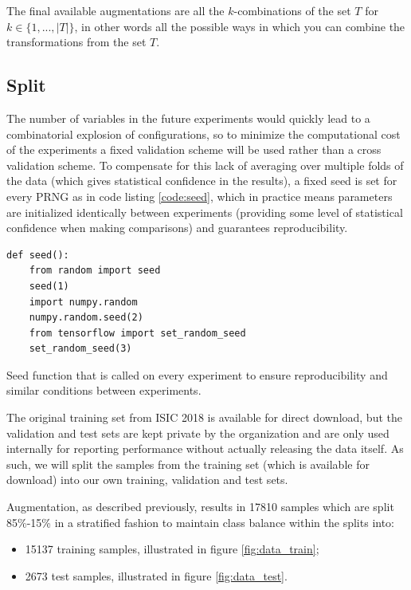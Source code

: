 The final available augmentations are all the $k$-combinations of the set $T$ for $k \in \{1, ..., |T|\}$, in other words all the possible ways in which you can combine the transformations from the set $T$.

\subsection{Split}

The number of variables in the future experiments would quickly lead to a combinatorial explosion of configurations, so to minimize the computational cost of the experiments a fixed validation scheme will be used rather than a cross validation scheme. To compensate for this lack of averaging over multiple folds of the data (which gives statistical confidence in the results), a fixed seed is set for every \ac{PRNG} as in code listing \ref{code:seed}, which in practice means parameters are initialized identically between experiments (providing some level of statistical confidence when making comparisons) and guarantees reproducibility.

\begin{listing}[ht]
\begin{verbatim}
def seed():
    from random import seed
    seed(1)
    import numpy.random
    numpy.random.seed(2)
    from tensorflow import set_random_seed
    set_random_seed(3)
\end{verbatim}
\caption{Seed function that is called on every experiment to ensure reproducibility and similar conditions between experiments.}
\label{code:seed}
\end{listing}

The original training set from \ac{ISIC} 2018 is available for direct download, but the validation and test sets are kept private by the organization and are only used internally for reporting performance without actually releasing the data itself. As such, we will split the samples from the training set (which is available for download) into our own training, validation and test sets.

Augmentation, as described previously, results in 17810 samples which are split 85\%-15\% in a stratified fashion to maintain class balance within the splits into:

\begin{itemize}
    \item 15137 training samples, illustrated in figure \ref{fig:data_train};
    \item 2673 test samples, illustrated in figure \ref{fig:data_test}.
\end{itemize}

